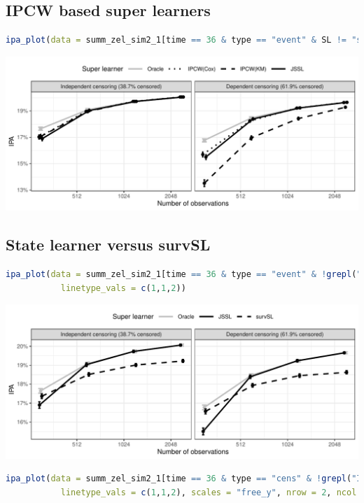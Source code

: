 \documentclass[11pt]{article}
\begin{document}
\subsection{IPCW based super learners}
\label{sec:org8486058}
\begin{lstlisting}[language=r,numbers=none]
  ipa_plot(data = summ_zel_sim2_1[time == 36 & type == "event" & SL != "survSL"])
\end{lstlisting}

\begin{center}
\includegraphics[width=.9\linewidth]{experiment-fig-sl-ipcw.pdf}
\label{}
\end{center}
\subsection{State learner versus survSL}
\label{sec:orgde73ddc}

\begin{lstlisting}[language=r,numbers=none]
  ipa_plot(data = summ_zel_sim2_1[time == 36 & type == "event" & !grepl("IPCW", SL)],
           linetype_vals = c(1,1,2))
\end{lstlisting}

\begin{center}
\includegraphics[width=.9\linewidth]{experiment-fig-sl-survSL-out.pdf}
\label{}
\end{center}

\begin{lstlisting}[language=r,numbers=none]
  ipa_plot(data = summ_zel_sim2_1[time == 36 & type == "cens" & !grepl("IPCW", SL)],
           linetype_vals = c(1,1,2), scales = "free_y", nrow = 2, ncol = 1)
\end{lstlisting}
\end{document}
